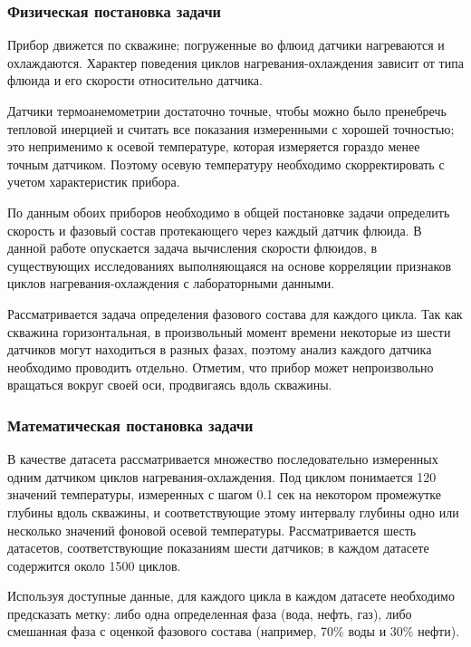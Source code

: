 \subsubsection{Физическая постановка задачи}
\par
Прибор движется по скважине; погруженные во флюид датчики нагреваются и охлаждаются. Характер поведения циклов нагревания-охлаждения зависит от типа флюида и его скорости относительно датчика.  
\par
Датчики термоанемометрии достаточно точные, чтобы можно было пренебречь тепловой инерцией и считать все показания измеренными с хорошей точностью; это неприменимо к осевой температуре, которая измеряется гораздо менее точным датчиком. Поэтому осевую температуру необходимо скорректировать с учетом характеристик прибора.
\par
По данным обоих приборов необходимо в общей постановке задачи определить скорость и фазовый состав протекающего через каждый датчик флюида. В данной работе опускается задача вычисления скорости флюидов, в существующих исследованиях выполняющаяся на основе корреляции признаков циклов нагревания-охлаждения с лабораторными данными. 
\par
Рассматривается задача определения фазового состава для каждого цикла. Так как скважина горизонтальная, в произвольный момент времени некоторые из шести датчиков могут находиться в разных фазах, поэтому анализ каждого датчика необходимо проводить отдельно. Отметим, что прибор может непроизвольно вращаться вокруг своей оси, продвигаясь вдоль скважины.

\subsubsection{Математическая постановка задачи}
\par
В качестве датасета рассматривается множество последовательно измеренных одним датчиком циклов нагревания-охлаждения. Под циклом понимается 120 значений температуры, измеренных с шагом 0.1 сек на некотором промежутке глубины вдоль скважины, и соответствующие этому интервалу глубины одно или несколько значений фоновой осевой температуры. Рассматривается шесть датасетов, соответствующие показаниям шести датчиков; в каждом датасете содержится около 1500 циклов.
\par
Используя доступные данные, для каждого цикла в каждом датасете необходимо предсказать метку: либо одна определенная фаза (вода, нефть, газ), либо смешанная фаза с оценкой фазового состава (например, 70\% воды и 30\% нефти).